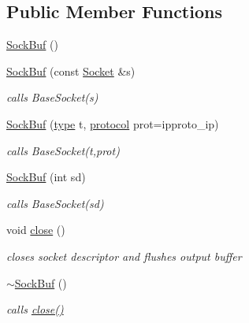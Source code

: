 \subsection*{Public Member Functions}
\begin{CompactItemize}
\item 
\hyperlink{classsocketpp_1_1SockBuf_e02aca0e93d6b6227ba492cdc2690d9a}{SockBuf} ()
\item 
\hyperlink{classsocketpp_1_1SockBuf_065ef76cdf18c04857350c643bd620e3}{SockBuf} (const \hyperlink{classsocketpp_1_1Socket}{Socket} \&s)
\begin{CompactList}\small\item\em calls BaseSocket(s) \item\end{CompactList}\item 
\hyperlink{classsocketpp_1_1SockBuf_5e8a5860fd67228e5d39ea28f9d67341}{SockBuf} (\hyperlink{namespacesocketpp_635f4c3b3f85aba331587404d59ae52d}{type} t, \hyperlink{namespacesocketpp_2969678def1c6c8cb4102802ca82e2cf}{protocol} prot=ipproto\_\-ip)
\begin{CompactList}\small\item\em calls BaseSocket(t,prot) \item\end{CompactList}\item 
\hyperlink{classsocketpp_1_1SockBuf_71bbd8cf2bd9dd79b8067b0ef771bf23}{SockBuf} (int sd)
\begin{CompactList}\small\item\em calls BaseSocket(sd) \item\end{CompactList}\item 
void \hyperlink{classsocketpp_1_1SockBuf_28f88c6ac0570ee5e9d57e255733b0f9}{close} ()
\begin{CompactList}\small\item\em closes socket descriptor and flushes output buffer \item\end{CompactList}\item 
\hyperlink{classsocketpp_1_1SockBuf_ee857faaed622effa453c7b53749ff14}{$\sim$SockBuf} ()
\begin{CompactList}\small\item\em calls \hyperlink{classsocketpp_1_1SockBuf_28f88c6ac0570ee5e9d57e255733b0f9}{close()} \item\end{CompactList}\end{CompactItemize}
